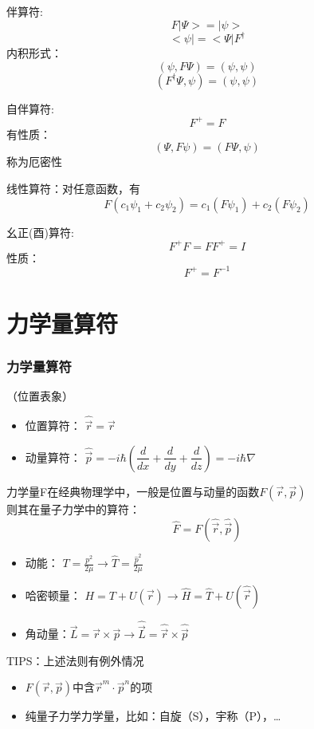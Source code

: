 \begin{frame} [allowframebreaks=]
\begin{definition}
        伴算符: 
        $$ F|\Psi> = |\psi> $$
        $$ <\psi| = <\Psi|F^{\dagger} $$
        内积形式：
        $$ (\psi,F\Psi)=(\psi,\psi)$$ 
        $$ (F^\dagger \Psi,\psi)=(\psi,\psi)$$ 
    \end{definition}   
    \begin{definition}
        自伴算符: 
        $$ F^{+} = F $$
        有性质：
        $$ (\Psi,F\psi)=(F\Psi,\psi)$$ 
        称为厄密性
    \end{definition} 
    \begin{definition}
        线性算符：对任意函数，有\\
        $$F(c_1\psi_1+c_2\psi_2 ) = c_1(F\psi_1)+c_2(F\psi_2 )$$
    \end{definition}
    \begin{definition}
        幺正(酉)算符: 
        $$ F^{+}F = FF^{+}=I $$
        性质：
        $$ F^{+}=F^{-1}$$ 
    \end{definition}         
\end{frame} 

\section{力学量算符}

\begin{frame} [allowframebreaks=]
    \frametitle{力学量算符}
    （位置表象）
    \begin{itemize}
        \item  位置算符： $ \hat{\vec{r}} =\vec{r} $
        \item  动量算符： $ \hat{\vec{p}} =-i\hbar(\dfrac{d}{d x}+ \dfrac{d}{d y} + \dfrac{d}{d z})=-i\hbar \nabla $
    \end{itemize}
    力学量F在经典物理学中，一般是位置与动量的函数$F(\vec{r},\vec{p})$\\
    则其在量子力学中的算符：$$ \hat{F}=F(\hat{\vec{r}},\hat{\vec{p}})$$
    \begin{exampleblock}{}
        \begin{itemize}
            \item  动能： $ T=\frac{p^2}{2\mu} \to \hat{T}= \frac{\hat{p}^2}{2\mu} $
            \item  哈密顿量： $ H=T+U(\vec{r} ) \to \hat{H}= \hat{T}+ U(\hat{\vec{r}})$
            \item  角动量：$ \vec{L}=\vec{r}\times\vec{p} \to \hat{\vec{L}}=\hat{\vec{r}}\times \hat{\vec{p}}$
        \end{itemize}
    \end{exampleblock}
\end{frame} 
\begin{frame}   
    TIPS：上述法则有例外情况
    \begin{itemize}
        \item  $F(\vec{r},\vec{p})$中含$\vec{r}^m\cdot\vec{p}^n$的项 
        \item  纯量子力学力学量，比如：自旋（S），宇称（P），\dots
    \end{itemize}
\end{frame} 

